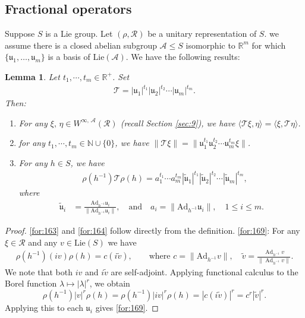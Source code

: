 \documentclass[11 pt]{amsart}
\newcommand{\NN}{\mathbb{N}}
\newcommand{\RR}{\mathbb{R}}
\newtheorem{lemma}[theorem]{Lemma}
\theoremstyle{definition}
\numberwithin{equation}{section}
\DeclareMathOperator{\Ad}{Ad}
\begin{document}
\subsection{Fractional operators} Suppose $S$ is a Lie group. Let $(\rho,\mathcal{R})$ be a unitary representation of $S$.  we assume there is a closed abelian subgroup $\mathcal{A}\le S$ isomorphic to $\RR^m$ for which $\{\mathfrak u_1,\ldots,\mathfrak u_m\}$ is a basis of $\text{Lie}(\mathcal{A})$.
We have the following results:
\begin{lemma}\label{le:17}  Let $t_1,\cdots, t_m\in\RR^+$. Set
\begin{align*}
 \mathcal{T}=|\mathfrak{u}_{1}|^{t_1}|\mathfrak{u}_{2}|^{t_2}\cdots |\mathfrak{u}_{m}|^{t_m}.
\end{align*}
Then:
\begin{enumerate}
  \item\label{for:163} For any $\xi,\,\eta\in W^{\infty,\,\mathcal{A}}(\mathcal{R})$ (recall Section \ref{sec:9}), we have $\langle \mathcal{T}\xi, \eta \rangle=\langle \xi, \mathcal{T}\eta\rangle$.


 \item\label{for:164} for any $t_1,\cdots, t_m\in\NN\cup \{0\}$, we have $\big\|\mathcal{T}\xi\big\|=\big\|\mathfrak{u}_{1}^{t_1}\mathfrak{u}_{2}^{t_2}\cdots \mathfrak{u}_{m}^{t_m}\xi\big\|$.


  \item\label{for:169} For any $h\in S$, we have
  \begin{align*}
  &\rho(h^{-1})\mathcal{T}\rho(h)=a_1^{t_1}\cdots a_m^{t_m}|\tilde{\mathfrak{u}}_{1}|^{t_1}|\tilde{\mathfrak{u}}_{2}|^{t_2}\cdots |\tilde{\mathfrak{u}}_{m}|^{t_m},
\end{align*}
  where
  \begin{align*}
 \tilde{\mathfrak{u}}_{i}&=\frac{\text{Ad}_{h^{-1}}\mathfrak{u}_{i}}{\|\text{Ad}_{h^{-1}}\mathfrak{u}_{i}\|},\quad\text{and} \quad
 a_i=\|\text{Ad}_{h^{-1}}\mathfrak{u}_{i}\|,\quad 1\leq i\leq m.
 \end{align*}


\end{enumerate}




\end{lemma}
\begin{proof} \eqref{for:163} and \eqref{for:164} follow directly from the definition. \eqref{for:169}:  For any $\xi\in \mathcal{R}$ and any $v\in \text{Lie}(S)$ we have
\begin{align*}
\rho(h^{-1})(iv)\rho(h)=c(i\tilde{v}),\qquad\text{where }c=\|\text{Ad}_{h^{-1}}v\|,\quad \tilde v=\frac{\Ad_{h^{-1}}v}{\|\Ad_{h^{-1}}v\|}.
\end{align*}
We note that both $iv$ and $i\tilde{v}$ are self-adjoint. Applying functional calculus to the Borel function $\lambda\mapsto |\lambda|^r$, we obtain
\[
\rho(h^{-1})|v|^r\rho(h)=\rho(h^{-1})|iv|^r\rho(h)=|c(i\tilde{v})|^r=c^r|\tilde{v}|^r.
\]
Applying this to each \(\mathfrak u_i\) gives \eqref{for:169}.

\end{proof}
\end{document}
